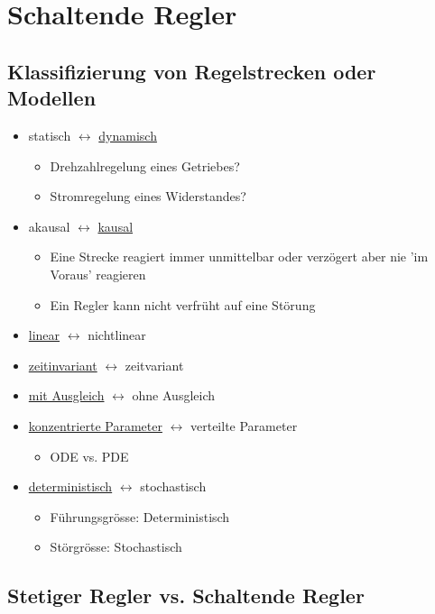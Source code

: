 \section{Schaltende Regler}

\subsection{Klassifizierung von Regelstrecken oder Modellen}

\begin{itemize}
    \item statisch $\leftrightarrow$ \underline{dynamisch} 
    \begin{itemize}
        \item Drehzahlregelung eines Getriebes?
        \item Stromregelung eines Widerstandes?
    \end{itemize}
    \item akausal $\leftrightarrow$ \underline{kausal}
    \begin{itemize}
        \item Eine Strecke reagiert immer unmittelbar oder verzögert aber nie 'im Voraus' reagieren
        \item Ein Regler kann nicht verfrüht auf eine Störung
    \end{itemize}
    \item \underline{linear} $\leftrightarrow$ nichtlinear
    \item \underline{zeitinvariant} $\leftrightarrow$ zeitvariant
    \item \underline{mit Ausgleich} $\leftrightarrow$ ohne Ausgleich
    \item \underline{konzentrierte Parameter} $\leftrightarrow$ verteilte Parameter
    \begin{itemize}
        \item ODE vs. PDE
    \end{itemize}
    \item \underline{deterministisch} $\leftrightarrow$ stochastisch
    \begin{itemize}
        \item Führungsgrösse: Deterministisch
        \item Störgrösse: Stochastisch
    \end{itemize}
\end{itemize}


\subsection{Stetiger Regler vs. Schaltende Regler}


